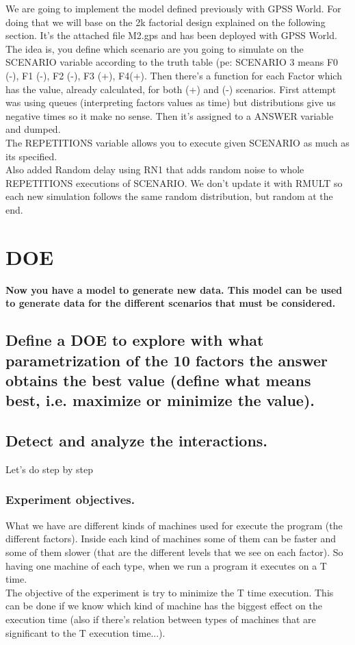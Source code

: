 \documentclass[12pt]{article}
\begin{document}
\hfill%
\begin{minipage}{0.6\textwidth}\raggedright
We are going to implement the model defined previously with GPSS World. For doing that we will base on the 2k factorial design explained on the following section. It's the attached file M2.gps and has been deployed with GPSS World.\\
The idea is, you define which scenario are you going to simulate on the SCENARIO variable according to the truth table (pe: SCENARIO 3 means F0 (-), F1 (-), F2 (-), F3 (+), F4(+). Then there's a function for each Factor which has the value, already calculated, for both (+) and (-) scenarios. First attempt was using queues (interpreting factors values as time) but distributions give us negative times so it make no sense. Then it's assigned to a ANSWER variable and dumped.\\
The REPETITIONS variable allows you to execute given SCENARIO as much as its specified.\\
Also added Random delay using RN1 that adds random noise to whole REPETITIONS executions of SCENARIO. We don't update it with RMULT so each new simulation follows the same random distribution, but random at the end.
\end{minipage}

\newpage
\section {DOE}
\vspace{5mm}
\textbf{Now you have a model to generate new data. This model can be used to generate data for the different scenarios that must be considered.}
\subsection {Define a DOE to explore with what parametrization of the 10 factors the answer obtains the best value (define what means best, i.e. maximize or minimize the value).}
\subsection {Detect and analyze the interactions.}
Let's do step by step

\subsubsection{Experiment objectives.}
What we have are different kinds of machines used for execute the program (the different factors). Inside each kind of machines some of them can be faster and some of them slower (that are the different levels that we see on each factor). So having one machine of each type, when we run a program it executes on a T time.\\
The objective of the experiment is try to minimize the T time execution. This can be done if we know which kind of machine has the biggest effect on the execution time (also if there's relation between types of machines that are significant to the T execution time...).
\end{document}
